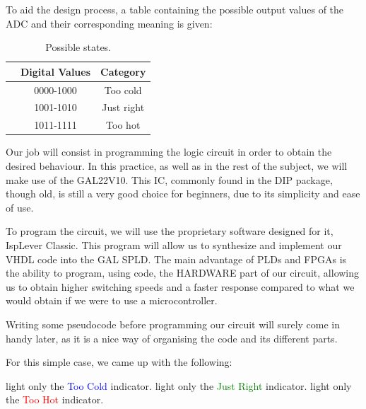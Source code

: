 \documentclass[a4paper, 11pt, oneside]{article}
\begin{document}
To aid the design process, a table containing the possible output values of the ADC and their corresponding meaning is given:

\begin{table}[ht]
    \centering
        \begin{tabular}[t]{lcc}
            \toprule
            &\textbf{Digital Values}&\textbf{Category}\\
            \midrule
            &0000-1000&Too cold\\
            &1001-1010&Just right\\
            &1011-1111&Too hot\\
            \bottomrule
        \end{tabular}
        \caption{Possible states.}
\end{table}

Our job will consist in programming the logic circuit in order to obtain the desired behaviour. In this practice, as well as in the rest of the subject, we will make use of the GAL22V10. This IC, commonly found in the DIP package, though old, is still a very good choice for beginners, due to its simplicity and ease of use.\medskip

\newpage

To program the circuit, we will use the proprietary software designed for it, IspLever Classic. This program will allow us to synthesize and implement our VHDL code into the GAL SPLD. The main advantage of PLDs and FPGAs is the ability to program, using code, the HARDWARE part of our circuit, allowing us to obtain higher switching speeds and a faster response compared to what we would obtain if we were to use a microcontroller.\medskip

Writing some pseudocode before programming our circuit will surely come in handy later, as it is a nice way of organising the code and its different parts.

For this simple case, we came up with the following:\medskip

\begin{algorithm}
        \begin{algorithmic}
            \STATE light only the \textcolor{blue}{Too Cold} indicator.
            \STATE light only the \textcolor{green}{Just Right} indicator.
            \ELSE{}
            \STATE light only the \textcolor{red}{Too Hot} indicator.
            \ENDIF
        \end{algorithmic}
\end{algorithm}
\end{document}
